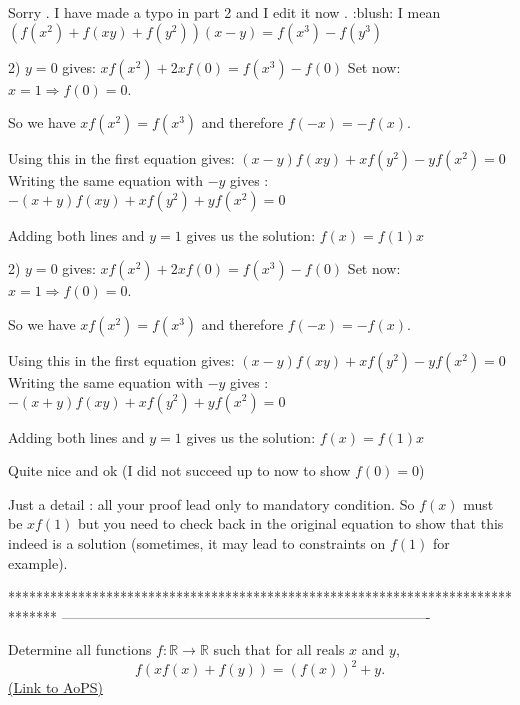 \begin{solution}
	Sorry . I have made a typo in part 2 and I edit it now . :blush: 
I mean $ (f(x^{2}) + f(xy) + f(y^{2}))(x - y) = f(x^{3}) - f(y^{3})$
\end{solution}



\begin{solution}
	2)
$ y=0$ gives: $ xf(x^2)+2xf(0)=f(x^3)-f(0)$
Set now: $ x=1 \Rightarrow f(0)=0$.

So we have $ xf(x^2)=f(x^3)$ and therefore $ f(-x)=-f(x)$.

Using this in the first equation gives: $ (x-y)f(xy)+xf(y^2)-yf(x^2)=0$
Writing the same equation with $ -y$ gives : $ -(x+y)f(xy)+xf(y^2)+yf(x^2)=0$

Adding both lines and $ y=1$ gives us the solution: $ \boxed{f(x)=f(1)x}$
\end{solution}



\begin{solution}
	\begin{tcolorbox}2)
$ y = 0$ gives: $ xf(x^2) + 2xf(0) = f(x^3) - f(0)$
Set now: $ x = 1 \Rightarrow f(0) = 0$.

So we have $ xf(x^2) = f(x^3)$ and therefore $ f( - x) = - f(x)$.

Using this in the first equation gives: $ (x - y)f(xy) + xf(y^2) - yf(x^2) = 0$
Writing the same equation with $ - y$ gives : $ - (x + y)f(xy) + xf(y^2) + yf(x^2) = 0$

Adding both lines and $ y = 1$ gives us the solution: $ \boxed{f(x) = f(1)x}$\end{tcolorbox}

Quite nice and ok (I did not succeed up to now to show $ f(0)=0$)

Just a detail : all your proof lead only to mandatory condition. So $ f(x)$ must be $ xf(1)$ but you need to check back in the original equation to show that this indeed is a solution (sometimes, it may lead to constraints on $ f(1)$ for example).
\end{solution}
*******************************************************************************
-------------------------------------------------------------------------------

\begin{problem}
	Determine all functions $f: \mathbb R \to \mathbb R$ such that for all reals $x$ and $y$,
\[ f(xf(x) + f(y))=(f(x))^2 + y.\]
	\flushright \href{https://artofproblemsolving.com/community/c6h313761}{(Link to AoPS)}
\end{problem}



